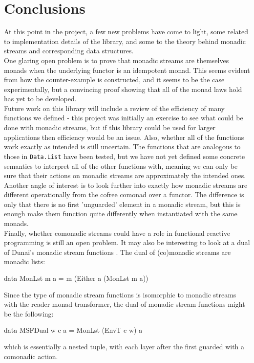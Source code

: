\section{Conclusions}

At this point in the project, a few new problems have come to light, some related to implementation details of the library, and some to the theory behind monadic streams and corresponding data structures. \\

One glaring open problem is to prove that monadic streams are themselves monads when the underlying functor is an idempotent monad. This seems evident from how the counter-example is constructed, and it seems to be the case experimentally, but a convincing proof showing that all of the monad laws hold has yet to be developed. \\

Future work on this library will include a review of the efficiency of many functions we defined - this project was initially an exercise to see what could be done with monadic streams, but if this library could be used for larger applications then efficiency would be an issue. Also, whether all of the functions work exactly as intended is still uncertain. The functions that are analogous to those in \verb+Data.List+ have been tested, but we have not yet defined some concrete semantics to interpret all of the other functions with, meaning we can only be sure that their actions on monadic streams are approximately the intended ones. \\

Another angle of interest is to look further into exactly how monadic streams are different operationally from the cofree comonad over a functor. The difference is only that there is no first 'unguarded' element in a monadic stream, but this is enough make them function quite differently when instantiated with the same monads. \\

Finally, whether comonadic streams could have a role in functional reactive programming is still an open problem. It may also be interesting to look at a dual of Dunai's monadic stream functions \cite{dunai}. The dual of (co)monadic streams are monadic lists:
\begin{haskell}
data MonLst m a = m (Either a (MonLst m a)) 
\end{haskell}
Since the type of monadic stream functions is isomorphic to monadic streams with the reader monad transformer, the dual of monadic stream functions might be the following:
\begin{haskell}
data MSFDual w e a = MonLst (EnvT e w) a
\end{haskell}
which is essentially a nested tuple, with each layer after the first guarded with a comonadic action. 

